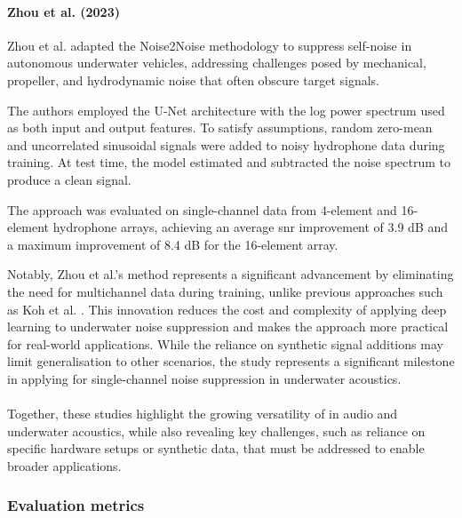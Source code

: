 \paragraph{Zhou et al. (2023)}

Zhou et al. \cite{zhou_self-noise_2023} adapted the Noise2Noise methodology to suppress self-noise in autonomous underwater vehicles, addressing challenges posed by mechanical, propeller, and hydrodynamic noise that often obscure target signals.

The authors employed the U-Net architecture with the log power spectrum used as both input and output features. To satisfy  assumptions, random zero-mean and uncorrelated sinusoidal signals were added to noisy hydrophone data during training. At test time, the model estimated and subtracted the noise spectrum to produce a clean signal.

The approach was evaluated on single-channel data from 4-element and 16-element hydrophone arrays, achieving an average \acrshort{snr} improvement of 3.9 dB and a maximum improvement of 8.4 dB for the 16-element array. 

Notably, Zhou et al.’s method represents a significant advancement by eliminating the need for multichannel data during training, unlike previous approaches such as Koh et al. \cite{koh_underwater_2020}. This innovation reduces the cost and complexity of applying deep learning to underwater noise suppression and makes the approach more practical for real-world applications. While the reliance on synthetic signal additions may limit generalisation to other scenarios, the study represents a significant milestone in applying  for single-channel noise suppression in underwater acoustics.

\paragraph{}
Together, these studies highlight the growing versatility of  in audio and underwater acoustics, while also revealing key challenges, such as reliance on specific hardware setups or synthetic data, that must be addressed to enable broader applications.

\subsubsection{Evaluation metrics}

